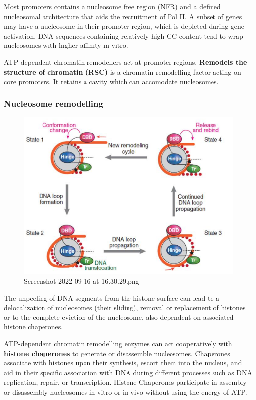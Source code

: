 Most promoters contains a nucleosome free region (NFR) and a defined nucleosomal architecture that aids the recruitment of Pol II. A subset of genes may have a nucleosome in their promoter region, which is depleted during gene activation. DNA sequences containing relatively high GC content tend to wrap nucleosomes with higher affinity in vitro.

ATP-dependent chromatin remodellers act at promoter regions. \textbf{Remodels the structure of chromatin (RSC)} is a chromatin remodelling factor acting on core promoters. It retains a cavity which can accomodate nucleosomes.

\hypertarget{nucleosome-remodelling}{%
\subsubsection{Nucleosome remodelling}\label{nucleosome-remodelling}}

\begin{figure}
\centering
\includegraphics[width=\textwidth]{../_resources/Screenshot_2022-09-16_at_16-30-29.png}
\caption{Screenshot 2022-09-16 at 16.30.29.png}
\end{figure}

The unpeeling of DNA segments from the histone surface can lead to a delocalization of nucleosomes (their sliding), removal or replacement of histones or to the complete eviction of the nucleosome, also dependent on associated histone chaperones.

ATP-dependent chromatin remodelling enzymes can act cooperatively with \textbf{histone chaperones} to generate or disassemble nucleosomes. Chaperones associate with histones upon their synthesis, escort them into the nucleus, and aid in their specific association with DNA during different processes such as DNA replication, repair, or transcription. Histone Chaperones participate in assembly or disassembly nucleosomes in vitro or in vivo without using the energy of ATP.

